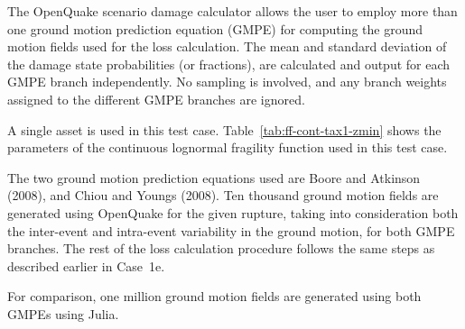 The OpenQuake scenario damage calculator allows the user to employ more than one ground motion prediction equation (GMPE) for computing the ground motion fields used for the loss calculation. The mean and standard deviation of the damage state probabilities (or fractions), are calculated and output for each GMPE branch independently. No sampling is involved, and any branch weights assigned to the different GMPE branches are ignored.

A single asset is used in this test case. Table~\ref{tab:ff-cont-tax1-zmin} shows the parameters of the continuous lognormal fragility function used in this test case.

The two ground motion prediction equations used are Boore and Atkinson (2008), and Chiou and Youngs (2008). Ten thousand ground motion fields are generated using OpenQuake for the given rupture, taking into consideration both the inter-event and intra-event variability in the ground motion, for both GMPE branches. The rest of the loss calculation procedure follows the same steps as described earlier in Case~1e.

For comparison, one million ground motion fields are generated using both GMPEs using Julia.